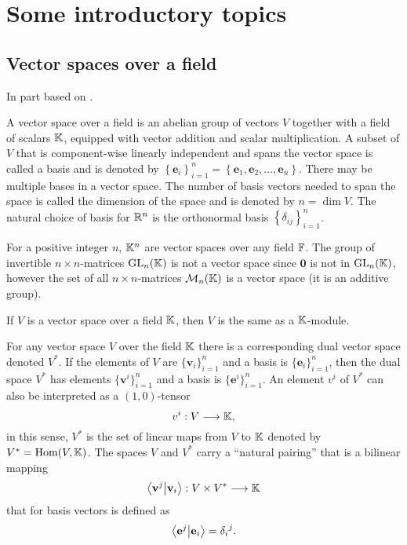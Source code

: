 \clearpage{\thispagestyle{empty}}
\section{Some introductory topics}
\subsection{Vector spaces over a field}

	In part based on \cite{Jeevanjee}.

	\begin{definition}
		A vector space over a field is an abelian group of vectors $V$ together with a field of scalars $\mathbb{K}$, equipped with vector addition and scalar multiplication. 
		A subset of $V$ that is component-wise linearly independent and spans the vector space is called a basis and is denoted by $\left\lbrace\mathbf{e}_i\right\rbrace_{i=1}^n = \left\lbrace \mathbf{e}_1, \mathbf{e}_2, \dots, \mathbf{e}_n \right\rbrace$. There may be multiple bases in a vector space. 
		The number of basis vectors needed to span the space is called the dimension of the space and is denoted by $n = \dim V$. 
		The natural choice of basis for $\mathbb{R}^n$ is the orthonormal basis $\left\lbrace \delta_{ij} \right\rbrace_{i=1}^n$.
	\end{definition}
	
	\begin{example}
		For a positive integer $n$, $\mathbb{K}^n$ are vector spaces over any field $\mathbb{F}$. The group of invertible $n \times n$-matrices $\text{GL}_n(\mathbb{K})$ is not a vector space since $\mathbf{0}$ is not in $\text{GL}_n(\mathbb{K})$, however the set of all $n \times n$-matrices $\mathcal{M}_n(\mathbb{K})$ is a vector space (it is an additive group).
	\end{example}
	
	\begin{remark}[Modules]
		If $V$ is a vector space over a field $\mathbb{K}$, then $V$ is the same as a $\mathbb{K}$-module.
	\end{remark}
	
	\begin{definition}
		For any vector space $V$ over the field $\mathbb{K}$ there is a corresponding dual vector space denoted $V^*$. If the elements of $V$ are $\{\mathbf{v}_i\}_{i=1}^n$ and a basis is $\{\mathbf{e}_i\}_{i=1}^n$, then the dual space $V^*$ has elements $\{\mathbf{v}^i\}_{i=1}^n$ and a basis is $\{\mathbf{e}^i\}_{i=1}^n$. An element $v^i$ of $V^*$ can also be interpreted as a $(1,0)$-tensor
		\[
			v^i: V \longrightarrow \mathbb{K},
		\]
		in this sense, $V^*$ is the set of linear maps from $V$ to $\mathbb{K}$ denoted by $V^* = \text{Hom}(V,\mathbb{K})$.
		The spaces $V$ and $V^*$ carry a ``natural pairing'' that is a bilinear mapping
		\[
			\bra{\mathbf{v}^j}\ket{\mathbf{v}_i}: V \times V^* \longrightarrow \mathbb{K}
		\]
		that for basis vectors is defined as
		\[
			\bra{\mathbf{e}^j}\ket{\mathbf{e}_i} = {\delta_i}^j.
		\]
	\end{definition}